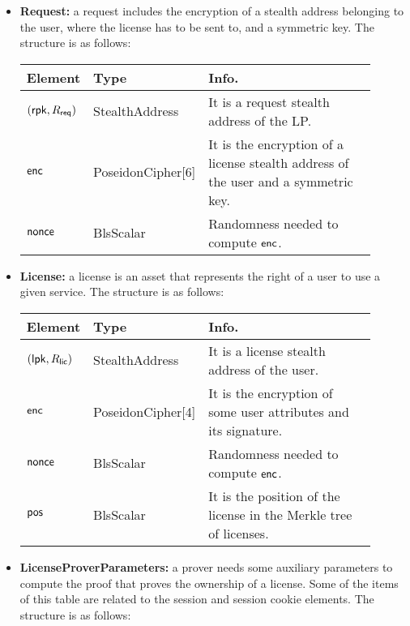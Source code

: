 \begin{itemize}
    \item \textbf{Request:} a request includes the encryption of a stealth address belonging to the user, where the license has to be sent to, and a symmetric key. The structure is as follows:

    \begin{center}
        \begin{tabular}{ | p{0.15\linewidth} | p{0.2\linewidth} | p{0.55\linewidth} | } 
        \hline
        \textbf{Element} & \textbf{Type} & \textbf{Info.} \\
        \hline
        $(\mathsf{rpk}, R_{\mathsf{req}})$ & StealthAddress & It is a request stealth address of the LP. \\
        $\mathsf{enc}$ & PoseidonCipher[6] & It is the encryption of a license stealth address of the user and a symmetric key. \\
        $\mathsf{nonce}$ & BlsScalar & Randomness needed to compute $\mathsf{enc}$. \\ 
        \hline
        \end{tabular}
    \end{center}

    \item \textbf{License:} a license is an asset that represents the right of a user to use a given service. The structure is as follows:

    \begin{center}
        \begin{tabular}{ | p{0.15\linewidth} | p{0.2\linewidth} | p{0.55\linewidth} | } 
        \hline
        \textbf{Element} & \textbf{Type} & \textbf{Info.} \\
        \hline
        $(\mathsf{lpk}, R_{\mathsf{lic}})$ & StealthAddress & It is a license stealth address of the user. \\
        $\mathsf{enc}$ & PoseidonCipher[4] & It is the encryption of some user attributes and its signature. \\
        $\mathsf{nonce}$ & BlsScalar & Randomness needed to compute $\mathsf{enc}$. \\ 
        $\mathsf{pos}$ & BlsScalar & It is the position of the license in the Merkle tree of licenses. \\ 
        \hline
        \end{tabular}
    \end{center}

    \item \textbf{LicenseProverParameters:} a prover needs some auxiliary parameters to compute the proof that proves the ownership of a license. Some of the items of this table are related to the session and session cookie elements. The structure is as follows:


\end{itemize}
